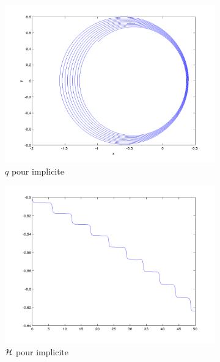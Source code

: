 \begin{figure}[!ht]
  \begin{subfigure}[b]{0.45\textwidth}
    \includegraphics[width=\textwidth]{images/Q1_implicite_q.png}
    \caption{$q$ pour implicite}
    \label{fig:q1_implicite_q}
  \end{subfigure}%
  \begin{subfigure}[b]{0.45\textwidth}
    \includegraphics[width=\textwidth]{images/Q1_implicite_H.png}
    \caption{$\mathcal{H}$ pour implicite}
    \label{fig:q1_implicite_H}
  \end{subfigure}
  \begin{subfigure}[b]{0.45\textwidth}

\end{subfigure}
\end{figure}
